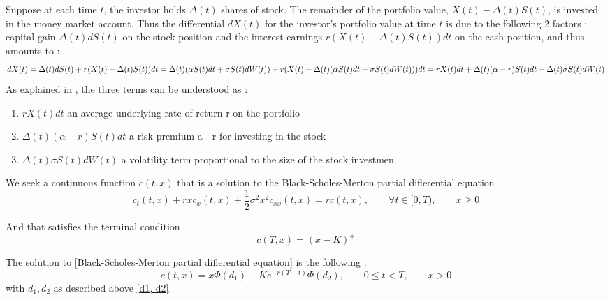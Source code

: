 \documentclass{article}
\begin{document}
    Suppose at each time $t$, the investor holds $\Delta(t)$ shares of stock. The remainder of the portfolio value, $X(t) - \Delta (t) S(t) $, is invested in the money market account. 
    Thus the differential $dX(t)$ for the investor's portfolio value at time $t$ is due to the following 2 factors :  capital gain $\Delta(t) dS(t)$ on the stock position and the
    interest earnings $r(X(t) - \Delta(t)S(t)) dt$ on the cash position, and thus amounts to : 
    $$
      dX(t) = \Delta (t) dS(t) + r(X(t) - \Delta(t)S(t)) dt
      \\= \Delta (t) (\alpha S(t) dt + \sigma S(t) dW(t)) + r(X(t) - \Delta(t)(\alpha S(t) dt + \sigma S(t) dW(t))) dt
      \\= rX(t) dt + \Delta (t) (\alpha -r)S(t) dt + \Delta (t) \sigma S(t) dW(t)
    $$
    As explained in \cite{shreve2004stochastic}, the three terms can be understood as :
    \begin{enumerate}
      \item $rX(t) dt$ an average underlying rate of return r on the portfolio
      \item $\Delta (t) (\alpha -r)S(t) dt$ a risk premium a - r for investing in the stock
      \item $\Delta (t) \sigma S(t) dW(t)$ a volatility term proportional to the size of the stock investmen
    \end{enumerate}

    We seek a continuous function $c(t, x)$ that is a solution to the Black-Scholes-Merton partial diflerential equation 
    \begin{equation}
      c_t(t,x)+rxc_x(t,x)+\frac{1}{2}\sigma^2 x^2 c_{xx}(t,x) = r c(t,x), \qquad \forall t \in [0,T), \qquad x\geq 0
      \label{Black-Scholes-Merton partial diflerential equation}
    \end{equation}

    And that satisfies the terminal condition 
    \begin{equation}
      c(T,x) = (x-K)^+
      \label{Terminal condition}
    \end{equation}

    The solution to \ref{Black-Scholes-Merton partial diflerential equation} is the following :
    \begin{equation}
      c(t,x)=x\Phi(d_1)-Ke^{-r(T-t)}\Phi(d_2) ,\qquad 0\leq t<T, \qquad x>0
      \label{solution to BSM}
    \end{equation}
    with $d_1,d_2$ as described above \ref{d1, d2}.
\end{document}
